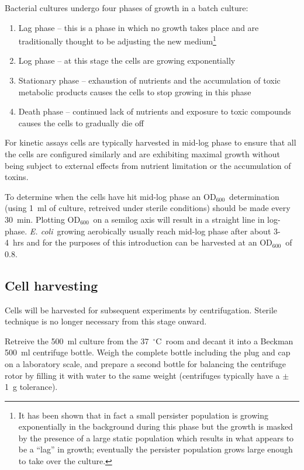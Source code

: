 \documentclass[a4paper]{article}
\newcommand{\dc}{~$^{\circ}$C}
\newcommand{\ec}{\textit{E. coli}}
\newcommand{\od}{OD$_{600}$}
\begin{document}
\begin{multicols}{2}
Bacterial cultures undergo four phases of growth in a batch culture:\\
\begin{enumerate} \item Lag phase -- this is a phase in which no growth takes
place and are traditionally thought to be adjusting the new medium\footnote{It
has been shown that in fact a small persister population is growing
exponentially in the background during this phase but the growth is masked by
the presence of a large static population which results in what appears to be a
``lag'' in growth; eventually the persister population grows large enough to
take over the culture.} \item Log phase -- at this stage the cells are growing
exponentially \item Stationary phase -- exhaustion of nutrients and the
accumulation of toxic metabolic products causes the cells to stop growing in
this phase \item Death phase -- continued lack of nutrients and exposure to
toxic compounds causes the cells to gradually die off \end{enumerate}

For kinetic assays cells are typically harvested in mid-log phase to ensure
that all the cells are configured similarly and are exhibiting maximal growth
without being subject to external effects from nutrient limitation or the
accumulation of toxins.

To determine when the cells have hit mid-log phase an \od\ determination (using
1~ml of culture, retreived under sterile conditions) should be made every
30~min. Plotting \od\ on a semilog axis will result in a straight line in
log-phase. \ec\ growing aerobically usually reach mid-log phase after about
3-4~hrs and for the purposes of this introduction can be harvested at an \od\
of 0.8.

\subsection{Cell harvesting} Cells will be harvested for subsequent experiments
by centrifugation. Sterile technique is no longer necessary from this stage
onward.

Retreive the 500~ml culture from the 37\dc\ room and decant it into a Beckman
500~ml centrifuge bottle. Weigh the complete bottle including the plug and cap
on a laboratory scale, and prepare a second bottle for balancing the centrifuge
rotor by filling it with water to the same weight (centrifuges typically have a
$\pm$1~g tolerance).


\end{multicols}
\end{document}
